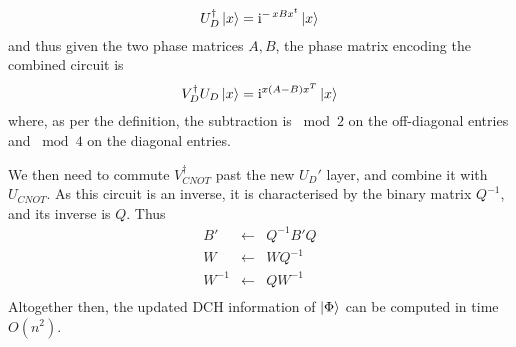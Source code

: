 \[U_{D}^{\dagger}\ket{x} = \mathrm{i}^{-\,xBx^{t}}\ket{x}\]
and thus given the two phase matrices $A,B$, the phase matrix encoding the combined circuit is
\[V_{D}^{\dagger}U_{D}\ket{x}=\mathrm{i}^{x \left(A-B\right)x^{T}}\ket{x}\]
where, as per the definition, the subtraction is $\bmod{2}$ on the off-diagonal entries and $\bmod{4}$ on the diagonal entries.\par
We then need to commute $V_{CNOT}^{\dagger}$ past the new $U_{D}'$ layer, and combine it with $U_{CNOT}$. As this circuit is an inverse, it is characterised by the binary matrix $Q^{-1}$, and its inverse is $Q$. Thus
\begin{equation}
\begin{array}{rcl}
B' & \gets & Q^{-1}B'Q \\
W & \gets & WQ^{-1}\\
W^{-1} & \gets & QW^{-1} \\
\end{array}
\end{equation}
Altogether then, the updated DCH information of $\ket{\Phi}$ can be computed in time $O(n^{2})$.\par
